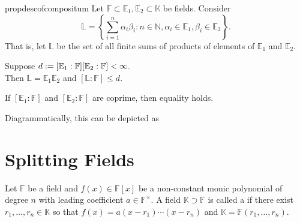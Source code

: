 \begin{restatable}[]{prop}{descofcompositum}
\label{prop:descofcompositum}
    Let $\mathbb{F} \subset \mathbb{E}_1, \mathbb{E}_2 \subset \mathbb{K}$ be fields. Consider
    \begin{equation*} 
        \mathbb{L} = \left\{\sum_{i = 1}^{n} \alpha_i\beta_i : n \in \mathbb{N}, \alpha_i \in \mathbb{E}_1, \beta_i \in \mathbb{E}_2\right\}.
    \end{equation*}
    That is, let $\mathbb{L}$ be the set of all finite sums of products of elements of $\mathbb{E}_1$ and $\mathbb{E}_2.$

    Suppose $d \vcentcolon= [\mathbb{E}_1 : \mathbb{F}][\mathbb{E}_2 : \mathbb{F}] < \infty.$ \\
    Then $\mathbb{L} = \mathbb{E}_1\mathbb{E}_2$ and $[\mathbb{L} : \mathbb{F}] \le d.$ 

     If $[\mathbb{E}_1 : \mathbb{F}]$ and $[\mathbb{E}_2 : \mathbb{F}]$ are coprime, then equality holds. \hfill\hyperref[prop:descofcompositum2]{\downsym}
\end{restatable}

Diagrammatically, this can be depicted as
\begin{center}
\end{center}

\section{Splitting Fields}

\begin{defn}%
    Let $\mathbb{F}$ be a field and $f(x) \in \mathbb{F}[x]$ be a non-constant monic polynomial of degree $n$ with leading coefficient $a \in \mathbb{F}^\times.$ A field $\mathbb{K} \supset \mathbb{F}$ is called a  if there exist $r_1, \ldots, r_n \in \mathbb{K}$ so that $f(x) = a(x - r_1)\cdots(x - r_n)$ and $\mathbb{K} = \mathbb{F}(r_1, \ldots, r_n).$
\end{defn}

